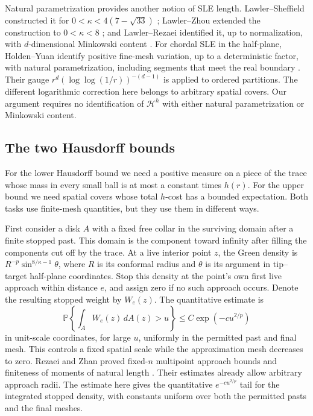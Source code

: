 Natural parametrization provides another notion of SLE length.
Lawler--Sheffield constructed it for
$0<\kappa<4(7-\sqrt{33})$ \cite[Theorem~3.1]{lawlersheffield2011};
Lawler--Zhou extended the construction to $0<\kappa<8$
\cite[Theorem~1]{lawlerzhou2013}; and Lawler--Rezaei identified it,
up to normalization, with $d$-dimensional Minkowski content
\cite[Theorem~1.1 and p.~5]{lawlerrezaei2015}.
For chordal SLE in the half-plane, Holden--Yuan identify positive
fine-mesh variation, up to a deterministic factor, with natural
parametrization, including segments that meet the real boundary
\cite[Theorems~1.7--1.8]{holdenyuan2026}.
Their gauge $r^d(\log\log(1/r))^{-(d-1)}$ is applied to ordered
partitions. The different logarithmic correction here belongs to
arbitrary spatial covers. Our argument requires no identification
of $\mathcal H^h$ with either natural parametrization or Minkowski
content.

\subsection{The two Hausdorff bounds}

For the lower Hausdorff bound we need a positive measure on a piece
of the trace whose mass in every small ball is at most a constant
times $h(r)$. For the upper bound we need spatial covers whose total
$h$-cost has a bounded expectation. Both tasks use finite-mesh
quantities, but they use them in different ways.

First consider a disk $A$ with a fixed free collar in the surviving
domain after a finite stopped past. This domain is the component
toward infinity after filling the components cut off by the trace.
At a live interior point $z$, the Green density is
$R^{-p}\sin^{8/\kappa-1}\theta$, where $R$ is its conformal radius
and $\theta$ is its argument in tip--target half-plane coordinates.
Stop this density at the point's own first live approach within
distance $e$, and assign zero if no such approach occurs. Denote
the resulting stopped weight by $W_e(z)$. The quantitative estimate is
\[
 \mathbb P\left\{\int_AW_e(z)\,dA(z)>u\right\}
        \le C\exp(-cu^{2/p})
\]
in unit-scale coordinates, for large $u$, uniformly in the permitted
past and final mesh. This controls a fixed spatial scale while the
approximation mesh decreases to zero. Rezaei and Zhan proved
fixed-$n$ multipoint approach bounds and finiteness of moments of natural
length \cite[Theorems~1.1--1.2]{rezaeizhan2017}. Their estimates already
allow arbitrary approach radii. The estimate here gives the quantitative
$e^{-cu^{2/p}}$ tail for the integrated stopped density, with constants
uniform over both the permitted pasts and the final meshes.


